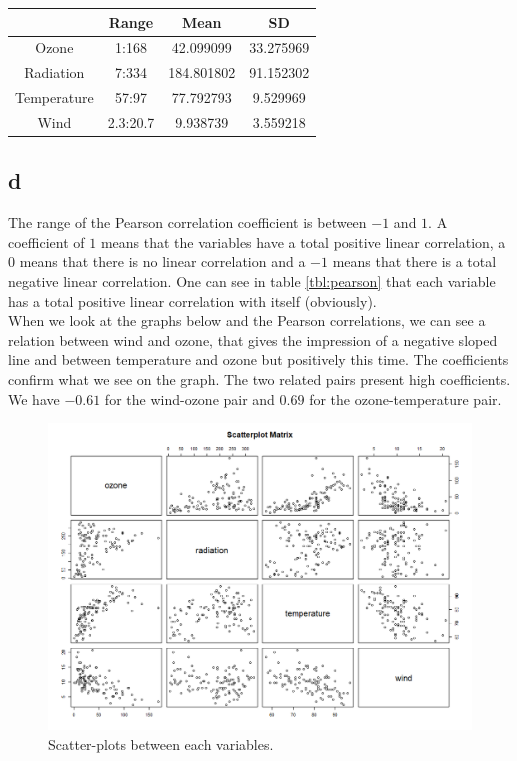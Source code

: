 \documentclass[11pt,a4paper,twoside,openright]{report}
\begin{document}
	 
	\begin{table}[H]
		\centering
		\begin{tabular}{|c|c|c|c|}
			\hline 
			& Range & Mean & SD \\ 
			\hline 
			Ozone & 1:168 & 42.099099 & 33.275969 \\ 
			\hline 
			Radiation & 7:334 & 184.801802 & 91.152302 \\ 
			\hline 
			Temperature & 57:97 & 77.792793 & 9.529969 \\ 
			\hline 
			Wind & 2.3:20.7 & 9.938739 & 3.559218 \\ 
			\hline 
		\end{tabular} 
	\end{table}
	
\subsection*{d}

The range of the Pearson correlation coefficient is between $-1$ and $1$. A coefficient of $1$ means that the variables have a total positive linear correlation, a $0$ means that there is no linear correlation and a $-1$ means that there is a total negative linear correlation. One can see in table \ref{tbl:pearson} that each variable has a total positive linear correlation with itself (obviously). \\

When we look at the graphs below and the Pearson correlations, we can see a relation between wind and ozone, that gives the impression of a negative sloped line and between temperature and ozone  but positively this time. The coefficients confirm what we see on the graph. The two related pairs present high coefficients. We have $-0.61$ for the wind-ozone pair and $0.69$ for the ozone-temperature pair. 
	
\begin{figure}[H]
	\centering
	\includegraphics[width=1\linewidth]{"img/ScatterplotByPair"}
	\caption{Scatter-plots between each variables.}
	\label{fig:scatterplotbypair}
\end{figure}
	
\end{document}
